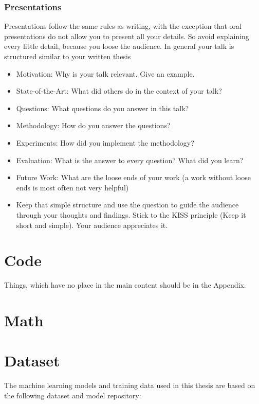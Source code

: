 \subsection{Presentations}
Presentations follow the same rules as writing, with the exception that oral presentations do not allow you to present all your details. So avoid explaining every little detail, because you loose the audience. In general your talk is structured similar to your written thesis

\begin{itemize}
\item Motivation: Why is your talk relevant. Give an example.
\item State-of-the-Art: What did others do in the context of your talk?
\item Questions: What questions do you answer in this talk?
\item Methodology: How do you answer the questions?
\item Experiments: How did you implement the methodology?
\item Evaluation:  What is the answer to every question? What did you learn?
\item Future Work: What are the loose ends of your work (a work without loose ends is most often not very helpful)
\item Keep that simple structure and use the question to guide the audience through your thoughts and findings. Stick to the KISS principle (Keep it short and simple). Your audience appreciates it.

\end{itemize}



\chapter{Code}

Things, which have no place in the main content should be in the Appendix.

\chapter{Math}

\chapter{Dataset}
\label{app:dataset}

The machine learning models and training data used in this thesis are based on the following dataset and model repository:

